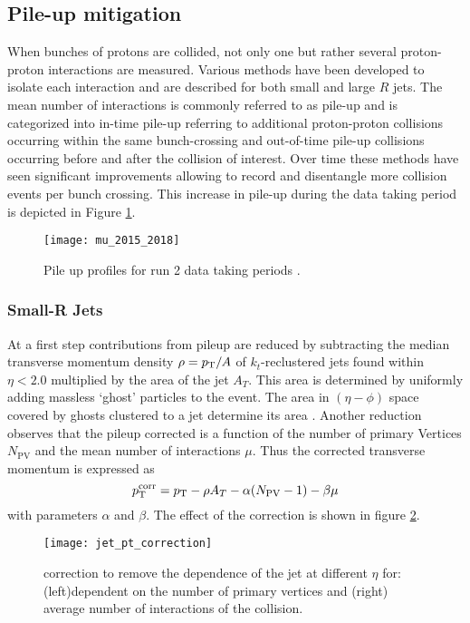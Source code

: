 \subsection{Pile-up mitigation}
When bunches of protons are collided, not only one but rather several proton-proton interactions are measured. Various methods have been developed to isolate each interaction and are described for both small and large $R$ jets. The mean number of interactions is commonly referred to as pile-up and is categorized into in-time pile-up referring to additional proton-proton collisions occurring within the same bunch-crossing and out-of-time pile-up collisions occurring before and after the collision of interest. Over time these methods have seen significant improvements allowing to record and disentangle more collision events per bunch crossing. This increase in pile-up during the data taking period is depicted in Figure \ref{fig:pileup}.
\begin{figure}
  \centering
  \texttt{[image: mu\_2015\_2018]}
  \caption[]{Pile up profiles for run 2 data taking periods \citep{pileup}.}
  \label{fig:pileup}
\end{figure}


\subsubsection{Small-R Jets}
At a first step contributions from pileup are reduced by subtracting the median transverse momentum density $\rho=p_{\text{T}} / A$ of $k_t$-reclustered jets found within $\eta<2.0$ multiplied by the area of the jet $A_T$. This area is determined by uniformly adding massless `ghost' particles to the event. The area in $(\eta-\phi)$ space covered by ghosts clustered to a jet determine its area \citep{ATLAS-CONF-2017-065}. Another reduction observes that the pileup corrected \pt is a function of the number of primary Vertices $N_\text{PV}$ and the mean number of interactions $\mu$. Thus the corrected transverse momentum is expressed as
\begin{equation}
  p_{\text{T}}^\text{corr}=p_{\text{T}}-\rho A_T -\alpha(N_\text{PV}-1)-\beta\mu
\end{equation}
with parameters $\alpha$ and $\beta$. The effect of the correction is shown in figure \ref{fig:jet_pt_correction}.
\begin{figure}
  \centering
  \texttt{[image: jet\_pt\_correction]}
  \caption[]{\pt correction to remove the \pt dependence of the jet at different $\eta$ for: (left)\pt dependent on the number of primary vertices and (right) average number of interactions of the collision.}
  \label{fig:jet_pt_correction}
\end{figure}

